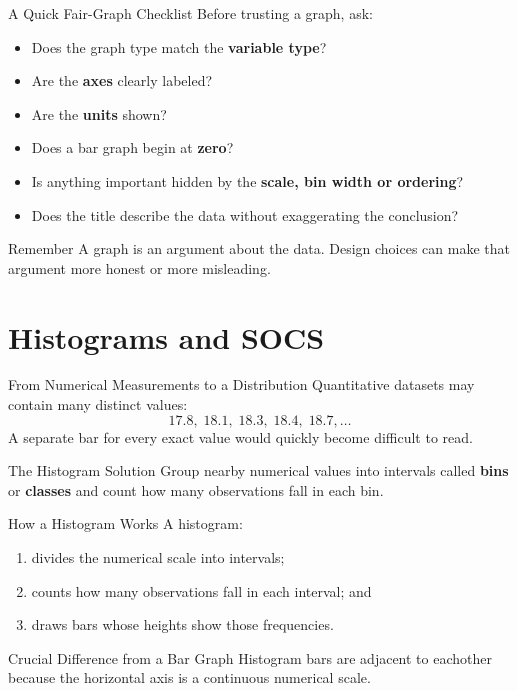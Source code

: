 \documentclass[aspectratio=169]{beamer}
\begin{document}
\begin{frame}{A Quick Fair-Graph Checklist}
  Before trusting a graph, ask:
  \begin{itemize}
    \item Does the graph type match the \textbf{variable type}?
    \item Are the \textbf{axes} clearly labeled?
    \item Are the \textbf{units} shown?
    \item Does a bar graph begin at \textbf{zero}?
    \item Is anything important hidden by the \textbf{scale, bin width or ordering}?
    \item Does the title describe the data without exaggerating the conclusion?
  \end{itemize}
  \begin{alertblock}{Remember}
    A graph is an argument about the data. Design choices can make that argument more honest or more misleading.
  \end{alertblock}
\end{frame}

\section{Histograms and SOCS}

\begin{frame}{From Numerical Measurements to a Distribution}
  Quantitative datasets may contain many distinct values:
  \[
    17.8,\;18.1,\;18.3,\;18.4,\;18.7,\ldots
  \]
  A separate bar for every exact value would quickly become difficult to read.
  \vspace{0.2cm}
  \begin{block}{The Histogram Solution}
    Group nearby numerical values into intervals called \textbf{bins} or \textbf{classes} and count how many observations fall in each bin.
  \end{block}
\end{frame}

\begin{frame}{How a Histogram Works}
  A histogram:
  \begin{enumerate}
    \item divides the numerical scale into intervals;
    \item counts how many observations fall in each interval; and
    \item draws bars whose heights show those frequencies.
  \end{enumerate}
  \vspace{0.2cm}
  \begin{alertblock}{Crucial Difference from a Bar Graph}
    Histogram bars are adjacent to eachother because the horizontal axis is a continuous numerical scale.
  \end{alertblock}
\end{frame}
\end{document}
